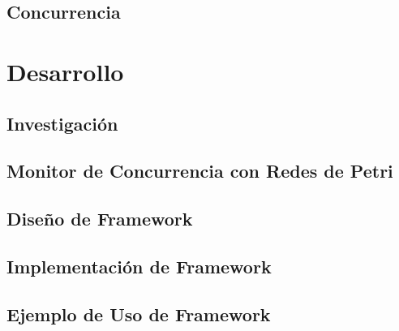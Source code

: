 \documentclass{report}
\begin{document}
        \chapter{Concurrencia}
            

    \part{Desarrollo}
        \chapter{Investigación}
            
        \chapter{Monitor de Concurrencia con Redes de Petri}
        	\label{cap:petri_monitor}
            
        \chapter{Diseño de \nombreFramework  Framework}
        	\label{cap:diseno_framework}
            
            
            
            
            
        \chapter{Implementación de \nombreFramework  Framework}
        	
       	\chapter{Ejemplo de Uso de \nombreFramework  Framework}
        	
    
	
\end{document}
